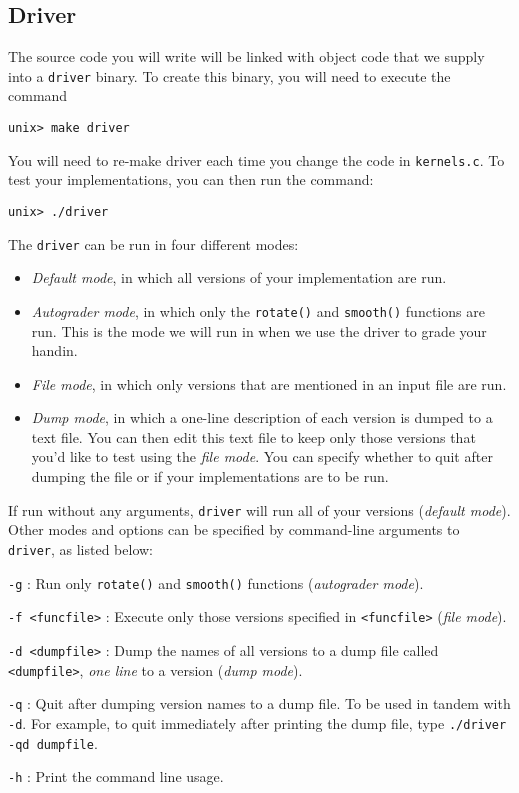 \documentclass[11pt]{article}
\begin{document}
\subsection*{Driver}
The source code you will write will be linked with object code that we
supply into a {\tt driver} binary. To create this binary, you will
need to execute the command
\small{\begin{verbatim}
unix> make driver
\end{verbatim}}
You will need to re-make driver each time you change the code in
{\tt kernels.c}.
To test your implementations, you can then run the command:
\small{\begin{verbatim}
unix> ./driver
\end{verbatim}}
The {\tt driver} can be run in four different modes:
\begin{itemize}
\item {\em Default mode}, in which all versions of your implementation are run.
\item {\em Autograder mode}, in which only the {\tt rotate()} and
{\tt smooth()} functions are run. This is the mode we will run in when
we use the driver to grade your handin.
\item {\em File mode}, in which only versions that are mentioned in 
an input file are run.
\item {\em Dump mode}, in which a one-line description of each version is
dumped to a text file. You can then edit this text file to keep only
those versions that you'd like to test using the {\it file mode}.
You can specify whether to quit after dumping the file 
or if your implementations are to be run.
\end{itemize}

If run without any arguments, {\tt driver} will run all of your
versions ({\em default mode}). 
Other modes and options can be specified by command-line arguments to {\tt
driver}, as listed below:
\begin{description}
\item {\tt -g} : Run only {\tt rotate()} and {\tt smooth()} functions 
({\em autograder mode}).
\item {\tt -f <funcfile>} : 
Execute only those versions specified in \texttt{<funcfile>} ({\it file mode}).
\item {\tt -d <dumpfile>} : Dump the names of all versions to a dump file
called \texttt{<dumpfile>}, {\it one line} to a version ({\it dump mode}).
\item {\tt -q} : Quit after dumping version names to a dump file. To be
used in tandem with {\tt -d}. For example, to quit immediately after
printing the dump file, type \texttt{./driver -qd dumpfile}.
\item {\tt -h} : Print the command line usage.
\end{description}
\end{document}
